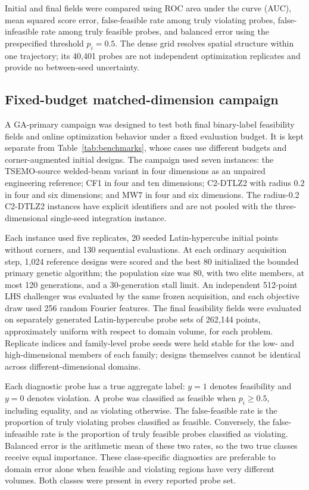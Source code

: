 \documentclass[twoside]{article}
\begin{document}
Initial and final fields were compared using ROC area under the curve (AUC),
mean squared score error, false-feasible rate among truly violating probes,
false-infeasible rate among truly feasible probes, and balanced error using
the prespecified threshold \(p_i=0.5\).  The dense grid resolves spatial
structure within one trajectory; its 40,401 probes are not independent
optimization replicates and provide no between-seed uncertainty.

\subsection{Fixed-budget matched-dimension campaign}
\label{sec:dimension-protocol}

A GA-primary campaign was designed to test both final binary-label
feasibility fields and online optimization behavior under a fixed evaluation
budget.  It is kept separate from Table~\ref{tab:benchmarks}, whose cases use
different budgets and corner-augmented initial designs.  The campaign used
seven instances: the TSEMO-source welded-beam variant in four dimensions as an unpaired engineering
reference; CF1 in four and ten dimensions; C2-DTLZ2 with radius \(0.2\) in
four and six dimensions; and MW7 in four and six dimensions.  The radius-0.2
C2-DTLZ2 instances have explicit identifiers and are not pooled with the
three-dimensional single-seed integration instance.

Each instance used five replicates, 20 seeded Latin-hypercube initial points
without corners, and 130 sequential
evaluations.  At each ordinary acquisition step, 1,024 reference designs were
scored and the best 80 initialized the bounded primary genetic algorithm;
the population size was 80, with two elite members, at most 120 generations,
and a 30-generation stall limit.  An independent 512-point LHS challenger
was evaluated by the same frozen acquisition, and each objective draw used
256 random Fourier features.  The final feasibility fields were evaluated on
separately generated Latin-hypercube probe sets of 262,144 points,
approximately uniform with respect to domain volume, for
each problem.  Replicate indices and family-level probe seeds were held
stable for the low- and high-dimensional members of each family; designs
themselves cannot be identical across different-dimensional domains.

Each diagnostic probe has a true aggregate label: \(y=1\) denotes feasibility
and \(y=0\) denotes violation. A probe was classified as feasible when
\(p_i\geq0.5\), including equality, and as violating otherwise. The
false-feasible rate is the proportion of truly violating probes classified as
feasible. Conversely, the false-infeasible rate is the proportion of truly
feasible probes classified as violating. Balanced error is the arithmetic mean
of these two rates, so the two true classes receive equal importance. These
class-specific diagnostics are preferable to domain error alone when feasible
and violating regions have very different volumes. Both classes were present
in every reported probe set.
\end{document}
